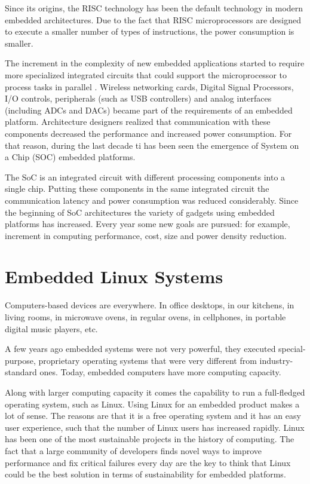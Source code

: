 Since its origins, the RISC technology has been the default technology in
modern embedded architectures. Due to the fact that RISC
microprocessors are designed to execute a smaller number of types of 
instructions, the power consumption is smaller.

The increment in the complexity of new embedded applications started to
require more specialized integrated circuits that could support the microprocessor
to process tasks in parallel . Wireless networking cards, Digital Signal
Processors, I/O controls, peripherals (such as USB controllers) and analog
interfaces (including ADCs and DACs) became part of the requirements of an
embedded platform. Architecture designers realized that communication with 
these components decreased the performance and increased power consumption. For
that reason, during the last decade ti has been seen the emergence
of System on a Chip (SOC)  embedded platforms. 

The SoC is an integrated circuit with different processing components into a single chip.
Putting these components in the same integrated circuit the communication
latency and power consumption was reduced considerably. Since the beginning of 
SoC architectures the variety of gadgets using embedded platforms has
increased. Every year some new goals are pursued: for example, increment in
computing performance, cost,  size and power density reduction.

\section{Embedded Linux Systems}

Computers-based devices are everywhere. In office desktops, in our kitchens, in
living rooms, in microwave ovens, in regular ovens, in cellphones, in portable
digital music players, etc. 

A few years ago embedded systems were not very powerful, they executed
special-purpose, proprietary operating systems that were very different
from industry-standard ones. Today, embedded computers have more computing
capacity. 

Along with larger computing capacity it comes the capability to run a full-fledged operating
system, such as Linux. Using Linux for an embedded product
makes a lot of sense. The reasons are that it is a free operating system and it
has an easy user experience, such that the number of Linux users has increased 
rapidly. Linux has been one of the most sustainable projects in the history of computing. The fact that a
large community of developers finds novel ways to improve performance and fix
critical failures every day are the key to think that Linux could be the best
solution in terms of sustainability for embedded platforms.

